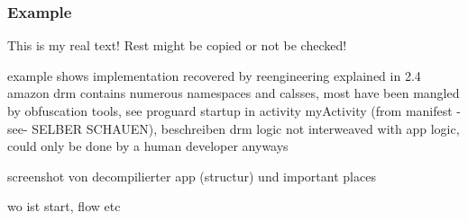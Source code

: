\subsubsection{Example}\label{subsection:license-amazon-example}
This is my real text! Rest might be copied or not be checked!

%
example shows implementation recovered by reengineering explained in 2.4
amazon drm contains numerous namespaces and calsses, most have been mangled by obfuscation tools, see proguard
startup in activity myActivity (from manifest -see- SELBER SCHAUEN), beschreiben
drm logic not interweaved with app logic, could only be done by a human developer anyways

\cite{munteanLicense}
%

screenshot von decompilierter app (structur) und important places

wo ist start, flow etc
